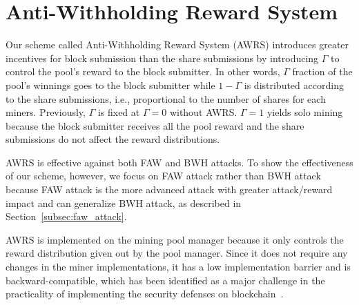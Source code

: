 \section{Anti-Withholding Reward System}
\label{sec:awrs}

Our scheme called Anti-Withholding Reward System (AWRS) introduces greater incentives for block submission than the share submissions by introducing $\Gamma$ to control the pool's reward to the block submitter. 
In other words, $\Gamma$ fraction of the pool's winnings goes to the block submitter while $1-\Gamma$ is distributed according to the share submissions, i.e., proportional to the number of shares for each miners. 
Previously, $\Gamma$ is fixed at $\Gamma=0$ without AWRS. 
$\Gamma=1$ yields solo mining because the block submitter receives all the pool reward and the share submissions do not affect the reward distributions.

AWRS is effective against both FAW and BWH attacks. %
To show the effectiveness of our scheme, however, we focus on FAW attack rather than BWH attack
because FAW attack is the more advanced attack with greater attack/reward impact and can generalize BWH attack, as described in Section~\ref{subsec:faw_attack}.

AWRS is implemented on the mining pool manager %
because it only controls the reward distribution given out by the pool manager.
Since it does not require any changes in the miner implementations, it has a low implementation barrier and is backward-compatible, which has been identified as a major challenge in the practicality of implementing the security defenses on blockchain~\cite{b4,b11}.



